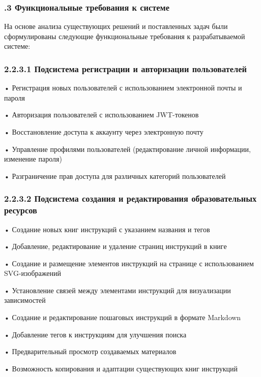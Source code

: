 \subtitlespace

\subsubsection*{ 
  \gostTitleFont
  .3 Функциональные требования к системе
} 

\subtitlespace

{\gostFont

  \par \redline На основе анализа существующих решений и поставленных задач были сформулированы следующие функциональные требования к разрабатываемой системе:

  \subsubsection*{2.2.3.1 Подсистема регистрации и авторизации пользователей}

  \par \redline • Регистрация новых пользователей с использованием электронной почты и пароля
  \par \redline • Авторизация пользователей с использованием JWT-токенов
  \par \redline • Восстановление доступа к аккаунту через электронную почту
  \par \redline • Управление профилями пользователей (редактирование личной информации, изменение пароля)
  \par \redline • Разграничение прав доступа для различных категорий пользователей

  \subsubsection*{2.2.3.2 Подсистема создания и редактирования образовательных ресурсов}

  \par \redline • Создание новых книг инструкций с указанием названия и тегов
  \par \redline • Добавление, редактирование и удаление страниц инструкций в книге
  \par \redline • Создание и размещение элементов инструкций на странице с использованием SVG-изображений
  \par \redline • Установление связей между элементами инструкций для визуализации зависимостей
  \par \redline • Создание и редактирование пошаговых инструкций в формате Markdown
  \par \redline • Добавление тегов к инструкциям для улучшения поиска
  \par \redline • Предварительный просмотр создаваемых материалов
  \par \redline • Возможность копирования и адаптации существующих книг инструкций

}
